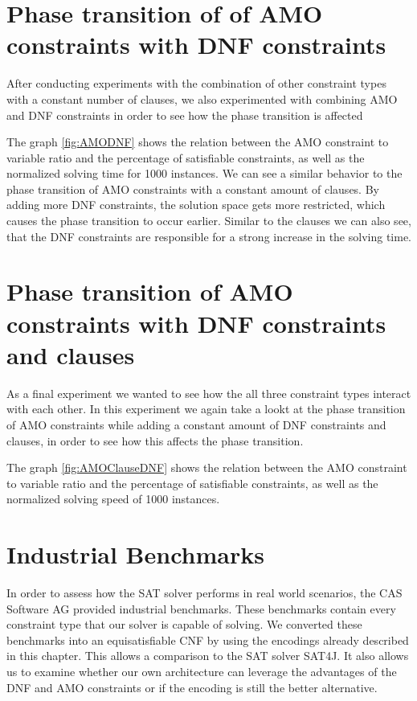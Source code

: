 \section{Phase transition of of AMO constraints with DNF constraints}

After conducting experiments with the combination of other constraint types with a constant number of clauses, we also experimented with combining AMO and DNF constraints in order to see how the phase transition is affected



The graph \ref{fig:AMODNF} shows the relation between the AMO constraint to variable ratio and the percentage of satisfiable constraints, as well as the normalized solving time for 1000 instances. We can see a similar behavior to the phase transition of AMO constraints with a constant amount of clauses. By adding more DNF constraints, the solution space gets more restricted, which causes the phase transition to occur earlier. Similar to the clauses we can also see, that the DNF constraints are responsible for a strong increase in the solving time.

\section{Phase transition of AMO constraints with DNF constraints and clauses}

As a final experiment we wanted to see how the all three constraint types interact with each other. In this experiment we again take a lookt at the phase transition of AMO constraints while adding a constant amount of DNF constraints and clauses, in order to see how this affects the phase transition.




The graph \ref{fig:AMOClauseDNF} shows the relation between the AMO constraint to variable ratio and the percentage of satisfiable constraints, as well as the normalized solving speed of 1000 instances.

\section{Industrial Benchmarks}

In order to assess how the SAT solver performs in real world scenarios, the CAS Software AG provided industrial benchmarks. These benchmarks contain every constraint type that our solver is capable of solving. We converted these benchmarks into an equisatisfiable CNF by using the encodings already described in this chapter. This allows a comparison to the SAT solver SAT4J. It also allows us to examine whether our own architecture can leverage the advantages of the DNF and AMO constraints or if the encoding is still the better alternative.


